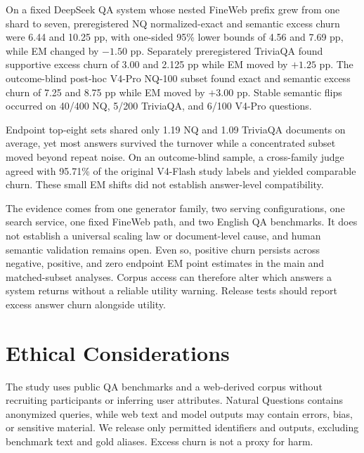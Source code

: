 \documentclass[sigconf,nonacm]{acmart}
\begin{document}
On a fixed DeepSeek QA system whose nested FineWeb prefix grew from one shard to seven, preregistered NQ normalized-exact and semantic excess churn were 6.44 and 10.25 pp, with one-sided 95\% lower bounds of 4.56 and 7.69 pp, while EM changed by $-1.50$ pp. Separately preregistered TriviaQA found supportive excess churn of 3.00 and 2.125 pp while EM moved by $+1.25$ pp. The outcome-blind post-hoc V4-Pro NQ-100 subset found exact and semantic excess churn of 7.25 and 8.75 pp while EM moved by $+3.00$ pp. Stable semantic flips occurred on 40/400 NQ, 5/200 TriviaQA, and 6/100 V4-Pro questions.

Endpoint top-eight sets shared only 1.19 NQ and 1.09 TriviaQA documents on average, yet most answers survived the turnover while a concentrated subset moved beyond repeat noise. On an outcome-blind sample, a cross-family judge agreed with 95.71\% of the original V4-Flash study labels and yielded comparable churn. These small EM shifts did not establish answer-level compatibility.

The evidence comes from one generator family, two serving configurations, one search service, one fixed FineWeb path, and two English QA benchmarks. It does not establish a universal scaling law or document-level cause, and human semantic validation remains open. Even so, positive churn persists across negative, positive, and zero endpoint EM point estimates in the main and matched-subset analyses. Corpus access can therefore alter which answers a system returns without a reliable utility warning. Release tests should report excess answer churn alongside utility.

\section*{Ethical Considerations}

The study uses public QA benchmarks and a web-derived corpus without recruiting participants or inferring user attributes. Natural Questions contains anonymized queries, while web text and model outputs may contain errors, bias, or sensitive material. We release only permitted identifiers and outputs, excluding benchmark text and gold aliases. Excess churn is not a proxy for harm.



\end{document}
